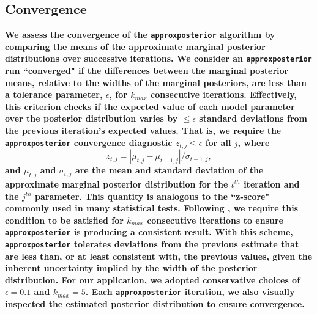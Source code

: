 \documentclass[twocolumn]{aastex62}
\newcommand{\xxx}[1]{{\textbf{#1}}}
\newcommand{\approxposterior}[0]{\texttt{approxposterior}\xspace}
\begin{document}

\subsection{Convergence} \label{sec:app:convergence}

\xxx{We assess the convergence of the \approxposterior algorithm by comparing the means of the approximate marginal posterior distributions over successive iterations. We consider an \approxposterior run ``converged" if the differences between the marginal posterior means, relative to the widths of the marginal posteriors, are less than a tolerance parameter, $\epsilon$, for $k_{max}$ consecutive iterations. Effectively, this criterion checks if the expected value of each model parameter over the posterior distribution varies by ${\leq}{\epsilon}$ standard deviations from the previous iteration's expected values. That is, we require the \approxposterior convergence diagnostic $z_{t,j}{\leq}{\epsilon}$ for all $j$, where}
\begin{equation}
    z_{t,j} = |\mu_{t,j} - \mu_{t-1,j}| / \sigma_{t-1,j},
\end{equation}
 \xxx{and $\mu_{t,j}$ and $\sigma_{t,j}$ are the mean and standard deviation of the approximate marginal posterior distribution for the $t^{th}$ iteration and the $j^{th}$ parameter. This quantity is analogous to the ``z-score" commonly used in many statistical tests. Following \citet{Wang2018}, we require this condition to be satisfied for $k_{max}$ consecutive iterations to ensure \approxposterior is producing a consistent result. With this scheme, \approxposterior tolerates deviations from the previous estimate that are less than, or at least consistent with, the previous values, given the inherent uncertainty implied by the width of the posterior distribution. For our application, we adopted conservative choices of $\epsilon = 0.1$ and $k_{max} = 5$. Each \approxposterior iteration, we also visually inspected the estimated posterior distribution to ensure convergence.} 
\end{document}
